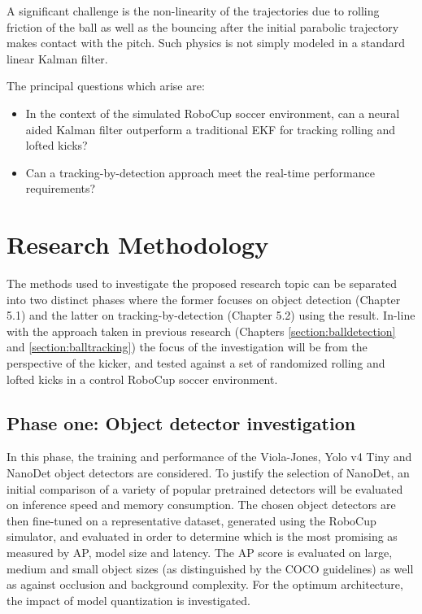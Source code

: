 \documentclass[a4paper,twoside,12pt]{report}
\begin{document}
A significant challenge is the non-linearity of the trajectories due to rolling friction of the ball as well as the bouncing after the initial parabolic trajectory makes contact with the pitch. Such physics is not simply modeled in a standard linear Kalman filter. 

The principal questions which arise are:
\begin{itemize}
    \item In the context of the simulated RoboCup soccer environment, can a neural aided Kalman filter outperform a traditional EKF for tracking rolling and lofted kicks?
	\item Can a tracking-by-detection approach meet the real-time performance requirements?
\end{itemize}

\chapter{Research Methodology}

The methods used to investigate the proposed research topic can be separated into two distinct phases where the former focuses on object detection (Chapter 5.1) and the latter on tracking-by-detection (Chapter 5.2) using the result. In-line with the approach taken in previous research (Chapters \ref{section:balldetection} and \ref{section:balltracking}) the focus of the investigation will be from the perspective of the kicker, and tested against a set of randomized rolling and lofted kicks in a control RoboCup soccer environment. 

\section{Phase one: Object detector investigation}

In this phase, the training and performance of the Viola-Jones, Yolo v4 Tiny and NanoDet object detectors are considered. To justify the selection of NanoDet, an initial comparison of a variety of popular pretrained detectors will be evaluated on inference speed and memory consumption. The chosen object detectors are then fine-tuned on a representative dataset, generated using the RoboCup simulator, and evaluated in order to determine which is the most promising as measured by AP, model size and latency. The AP score is evaluated on large, medium and small object sizes (as distinguished by the COCO guidelines) as well as against occlusion and background complexity. For the optimum architecture, the impact of model quantization is investigated.
\end{document}
